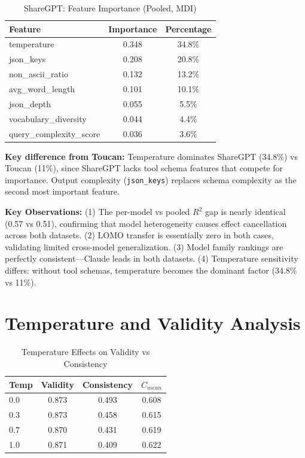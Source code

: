 \documentclass[sigconf,anonymous,review]{acmart}
\begin{document}
\begin{table}[h]
\centering
\caption{ShareGPT: Feature Importance (Pooled, MDI)}
\label{tab:sharegpt_feature_importance}
\small
\begin{tabular}{@{}lcc@{}}
\toprule
\textbf{Feature} & \textbf{Importance} & \textbf{Percentage} \\
\midrule
temperature & 0.348 & 34.8\% \\
json\_keys & 0.208 & 20.8\% \\
non\_ascii\_ratio & 0.132 & 13.2\% \\
avg\_word\_length & 0.101 & 10.1\% \\
json\_depth & 0.055 & 5.5\% \\
vocabulary\_diversity & 0.044 & 4.4\% \\
query\_complexity\_score & 0.036 & 3.6\% \\
\bottomrule
\end{tabular}
\end{table}

\textbf{Key difference from Toucan:} Temperature dominates ShareGPT (34.8\%) vs Toucan (11\%), since ShareGPT lacks tool schema features that compete for importance. Output complexity (\texttt{json\_keys}) replaces schema complexity as the second most important feature.

\textbf{Key Observations:} (1) The per-model vs pooled $R^2$ gap is nearly identical (0.57 vs 0.51), confirming that model heterogeneity causes effect cancellation across both datasets. (2) LOMO transfer is essentially zero in both cases, validating limited cross-model generalization. (3) Model family rankings are perfectly consistent---Claude leads in both datasets. (4) Temperature sensitivity differs: without tool schemas, temperature becomes the dominant factor (34.8\% vs 11\%).

\section{Temperature and Validity Analysis}
\label{app:temp_validity}

\begin{table}[h]
\centering
\caption{Temperature Effects on Validity vs Consistency}
\small
\begin{tabular}{@{}lccc@{}}
\toprule
\textbf{Temp} & \textbf{Validity} & \textbf{Consistency} & \textbf{$C_{mean}$} \\
\midrule
0.0 & 0.873 & 0.493 & 0.608 \\
0.3 & 0.873 & 0.458 & 0.615 \\
0.7 & 0.870 & 0.431 & 0.619 \\
1.0 & 0.871 & 0.409 & 0.622 \\
\bottomrule
\end{tabular}
\end{table}
\end{document}
